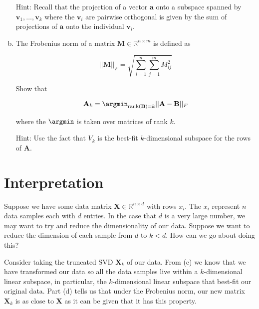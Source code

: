 \begin{enumerate}[(a)]
    Hint: Recall that the projection of a vector $\textbf{a}$ onto a subspace spanned by $\textbf{v}_1, \dots, \textbf{v}_k$ where the $\textbf{v}_i$ are pairwise orthogonal is given by the sum of projections of $\textbf{a}$ onto the individual $\textbf{v}_i$. 
    
    \newpage
    
    
    \item {} The Frobenius norm of a matrix $\textbf{M} \in \mathbb{R}^{n \times m}$ is defined as 
    
    \begin{equation}
        \vert \vert \textbf{M}\vert \vert _{F} = \sqrt{\sum_{i=1}^{n} \sum_{j=1}^{m} M_{ij}^2}
        \label{frob}
    \end{equation}
    
    Show that 
    
    \begin{equation}
        \textbf{A}_{k} = \argmin_{\textrm{rank}(\textbf{B}) = k}\vert \vert \textbf{A} - \textbf{B}\vert \vert _{F}
        \label{frob_min}
    \end{equation}

    where the $\argmin$ is taken over matrices of rank $k$. \newline
    
    Hint: Use the fact that $V_{k}$ is the best-fit $k$-dimensional subspace for the rows of $\textbf{A}$.
    
    \newpage
    
\end{enumerate}

\section{Interpretation}

Suppose we have some data matrix $\textbf{X} \in \mathbb{R}^{n \times d}$ with rows $x_i$. The $x_i$ represent $n$ data samples each with $d$ entries. In the case that $d$ is a very large number, we may want to try and reduce the dimensionality of our data. Suppose we want to reduce the dimension of each sample from $d$ to $k < d$. How can we go about doing this? \newline

Consider taking the truncated SVD $\textbf{X}_k$ of our data. From (c) we know that we have transformed our data so all the data samples live within a $k$-dimensional linear subspace, in particular, the $k$-dimensional linear subspace that best-fit our original data. Part (d) tells us that under the Frobenius norm, our new matrix $\textbf{X}_k$ is as close to $\textbf{X}$ as it can be given that it has this property. \newline

